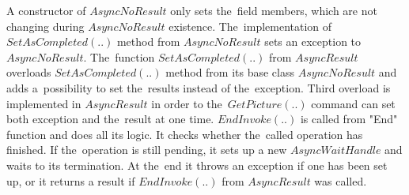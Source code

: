   \begin{remark}
  A constructor of $AsyncNoResult$ only sets the~field members, 
  which are not changing during $AsyncNoResult$ existence.
  The~implementation of $SetAsCompleted(..)$ method 
  from $AsyncNoResult$ sets an exception to $AsyncNoResult$.
  The~function $SetAsCompleted(..)$ from $AsyncResult$ overloads $SetAsCompleted(..)$ method
  from its base class $AsyncNoResult$ and adds 
  a~possibility to set the~results instead of the~exception.
  Third overload is implemented in $AsyncResult$ in order to the~$GetPicture(..)$ 
  command can set both exception and the~result at one time.
  $EndInvoke(..)$ is called from "End" function and does all its logic. 
  It checks whether the~called operation has finished.
  If the~operation is still pending, it sets up a new $AsyncWaitHandle$
  and waits to its termination. At the~end it throws an exception if one has been set up, 
  or it returns a result if $EndInvoke(..)$ from $AsyncResult$ was called.
  \end{remark}

